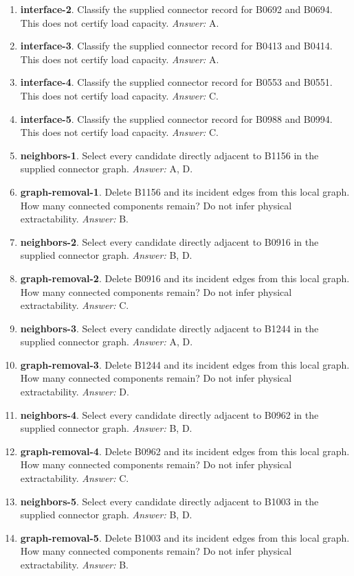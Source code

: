 \begin{enumerate}
\item \textbf{interface-2}. Classify the supplied connector record for B0692 and B0694. This does not certify load capacity. \textit{Answer:} A.
\item \textbf{interface-3}. Classify the supplied connector record for B0413 and B0414. This does not certify load capacity. \textit{Answer:} A.
\item \textbf{interface-4}. Classify the supplied connector record for B0553 and B0551. This does not certify load capacity. \textit{Answer:} C.
\item \textbf{interface-5}. Classify the supplied connector record for B0988 and B0994. This does not certify load capacity. \textit{Answer:} C.
\item \textbf{neighbors-1}. Select every candidate directly adjacent to B1156 in the supplied connector graph. \textit{Answer:} A, D.
\item \textbf{graph-removal-1}. Delete B1156 and its incident edges from this local graph. How many connected components remain? Do not infer physical extractability. \textit{Answer:} B.
\item \textbf{neighbors-2}. Select every candidate directly adjacent to B0916 in the supplied connector graph. \textit{Answer:} B, D.
\item \textbf{graph-removal-2}. Delete B0916 and its incident edges from this local graph. How many connected components remain? Do not infer physical extractability. \textit{Answer:} C.
\item \textbf{neighbors-3}. Select every candidate directly adjacent to B1244 in the supplied connector graph. \textit{Answer:} A, D.
\item \textbf{graph-removal-3}. Delete B1244 and its incident edges from this local graph. How many connected components remain? Do not infer physical extractability. \textit{Answer:} D.
\item \textbf{neighbors-4}. Select every candidate directly adjacent to B0962 in the supplied connector graph. \textit{Answer:} B, D.
\item \textbf{graph-removal-4}. Delete B0962 and its incident edges from this local graph. How many connected components remain? Do not infer physical extractability. \textit{Answer:} C.
\item \textbf{neighbors-5}. Select every candidate directly adjacent to B1003 in the supplied connector graph. \textit{Answer:} B, D.
\item \textbf{graph-removal-5}. Delete B1003 and its incident edges from this local graph. How many connected components remain? Do not infer physical extractability. \textit{Answer:} B.

\end{enumerate}
